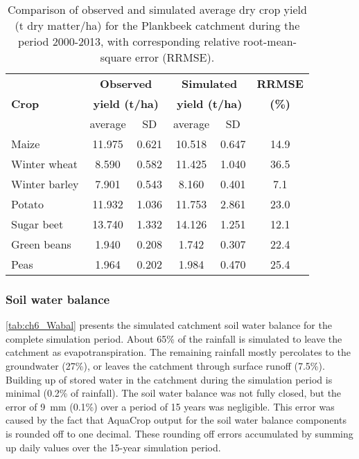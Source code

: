 \begin{table}[htbp]
  \centering
  	\caption{Comparison of observed and simulated average dry crop yield (t dry matter/ha) for the Plankbeek catchment during the period 2000-2013, with corresponding relative root-mean-square error (RRMSE).}
\begin{tabular}{lccccc}
\toprule
      & \multicolumn{2}{c}{\textbf{Observed}} & \multicolumn{2}{c}{\textbf{Simulated}} & \multicolumn{1}{c}{\textbf{RRMSE}} \\
 \textbf{Crop}     & \multicolumn{2}{c}{\textbf{yield (\si{t/ha})}} & \multicolumn{2}{c}{\textbf{yield (\si{t/ha})}} & \textbf{(\%)} \\
      & average & SD    & average & SD    & \multicolumn{1}{l}{} \\
\midrule
Maize & 11.975 & 0.621 & 10.518 & 0.647 & 14.9 \\
Winter wheat  & 8.590 & 0.582 & 11.425 & 1.040 & 36.5 \\
Winter barley  & 7.901 & 0.543 & 8.160 & 0.401 & 7.1 \\
Potato & 11.932 & 1.036 & 11.753 & 2.861 & 23.0 \\
Sugar beet & 13.740 & 1.332 & 14.126 & 1.251 & 12.1 \\
Green beans & 1.940 & 0.208 & 1.742 & 0.307 & 22.4 \\
Peas  & 1.964 & 0.202 & 1.984 & 0.470 & 25.4 \\
\bottomrule
\end{tabular}%
  \label{tab:ch6_YieldPerf}%
  \end{table}

\subsubsection{Soil water balance}
\autoref{tab:ch6_Wabal} presents the simulated catchment soil water balance for the complete simulation period. About 65\% of the rainfall is simulated to leave the catchment as evapotranspiration. The remaining rainfall mostly percolates to the groundwater (27\%), or leaves the catchment through surface runoff (7.5\%). Building up of stored water in the catchment during the simulation period is minimal (0.2\% of rainfall). The soil water balance was not fully closed, but the error of \SI{9}{mm} (0.1\%) over a period of 15 years was negligible. This error was caused by the fact that AquaCrop output for the soil water balance components is rounded off to one decimal. These rounding off errors accumulated by summing up daily values over the 15-year simulation period. 

